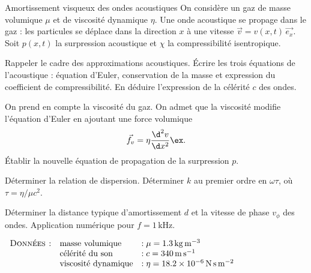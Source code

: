 \begin{exo}[PSI]{Amortissement visqueux des ondes acoustiques}
On considère un gaz de masse volumique $\mu$ et de viscosité dynamique $\eta$. Une onde acoustique se propage dans le gaz : les particules se déplace dans la direction $x$ à une vitesse $\vec{v}=v(x,t)\,\vec{e_{x}}$. Soit $p(x,t)$ la surpression acoustique et $\chi$ la compressibilité isentropique.

 \begin{quest}
 \item Rappeler le cadre des approximations acoustiques. Écrire les trois équations de l'acoustique : équation d'Euler, conservation de la masse et expression du coefficient de compressibilité. En déduire l’expression de la célérité $c$ des ondes.


  \item On prend en compte la viscosité du gaz. On admet que la viscosité modifie l’équation d’Euler en ajoutant une force volumique
  \begin{equation}
  \vec{f_v} = \eta \dfrac{\d^2 v}{\d x^2} \ex.
  \end{equation}
Établir la nouvelle équation de propagation de la surpression $p$.
  \item Déterminer la relation de dispersion. Déterminer $k$ au premier ordre en $\omega\tau$, où $\tau=\eta/\mu c^{2}$.
  \item Déterminer la distance typique  d'amortissement $d$ et la vitesse de phase $v_\phi$ des ondes. Application numérique pour $f=1\,\text{kHz}$.


 \end{quest}

  $\begin{array}{lll}
\textsc{Données :}
& \text{masse volumique} & :  \mu = \SI{1.3}{kg.m^{-3}} \\
& \text{célérité du son} & : c = \SI{340}{m.s^{-1}} \\
& \text{viscosité dynamique} & : \eta=\SI{18.2e-6}{N.s.m^{-2}}
\end{array}
$

\end{exo}

